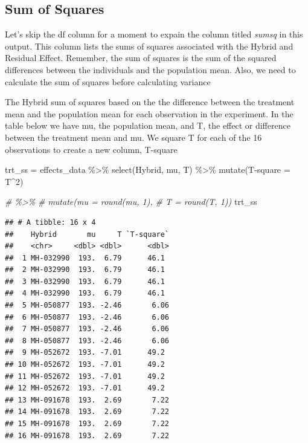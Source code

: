 \documentclass[
]{book}
\newenvironment{Shaded}{\begin{snugshade}}{\end{snugshade}}
\newcommand{\AttributeTok}[1]{\textcolor[rgb]{0.77,0.63,0.00}{#1}}
\newcommand{\CommentTok}[1]{\textcolor[rgb]{0.56,0.35,0.01}{\textit{#1}}}
\newcommand{\DecValTok}[1]{\textcolor[rgb]{0.00,0.00,0.81}{#1}}
\newcommand{\FunctionTok}[1]{\textcolor[rgb]{0.00,0.00,0.00}{#1}}
\newcommand{\NormalTok}[1]{#1}
\newcommand{\OtherTok}[1]{\textcolor[rgb]{0.56,0.35,0.01}{#1}}
\newcommand{\SpecialCharTok}[1]{\textcolor[rgb]{0.00,0.00,0.00}{#1}}
\newcommand{\StringTok}[1]{\textcolor[rgb]{0.31,0.60,0.02}{#1}}
\begin{document}
\hypertarget{sum-of-squares-1}{%
\subsection{Sum of Squares}\label{sum-of-squares-1}}

Let's skip the df column for a moment to expain the column titled \emph{sumsq} in this output. This column lists the sums of squares associated with the Hybrid and Residual Effect. Remember, the sum of squares is the sum of the squared differences between the individuals and the population mean. Also, we need to calculate the sum of squares before calculating variance

The Hybrid sum of squares based on the the difference between the treatment mean and the population mean for each observation in the experiment. In the table below we have mu, the population mean, and T, the effect or difference between the treatment mean and mu. We square T for each of the 16 observations to create a new column, T-square

\begin{Shaded}
\begin{Highlighting}[]
\NormalTok{trt\_ss }\OtherTok{=}\NormalTok{ effects\_data }\SpecialCharTok{\%\textgreater{}\%}
  \FunctionTok{select}\NormalTok{(Hybrid, mu, T) }\SpecialCharTok{\%\textgreater{}\%}
  \FunctionTok{mutate}\NormalTok{(}\StringTok{\textasciigrave{}}\AttributeTok{T{-}square}\StringTok{\textasciigrave{}} \OtherTok{=}\NormalTok{ T}\SpecialCharTok{\^{}}\DecValTok{2}\NormalTok{)}

\CommentTok{\# \%\textgreater{}\% }
\CommentTok{\#   mutate(mu = round(mu, 1),}
\CommentTok{\#          T = round(T, 1)) }
\NormalTok{trt\_ss}
\end{Highlighting}
\end{Shaded}

\begin{verbatim}
## # A tibble: 16 x 4
##    Hybrid       mu     T `T-square`
##    <chr>     <dbl> <dbl>      <dbl>
##  1 MH-032990  193.  6.79      46.1 
##  2 MH-032990  193.  6.79      46.1 
##  3 MH-032990  193.  6.79      46.1 
##  4 MH-032990  193.  6.79      46.1 
##  5 MH-050877  193. -2.46       6.06
##  6 MH-050877  193. -2.46       6.06
##  7 MH-050877  193. -2.46       6.06
##  8 MH-050877  193. -2.46       6.06
##  9 MH-052672  193. -7.01      49.2 
## 10 MH-052672  193. -7.01      49.2 
## 11 MH-052672  193. -7.01      49.2 
## 12 MH-052672  193. -7.01      49.2 
## 13 MH-091678  193.  2.69       7.22
## 14 MH-091678  193.  2.69       7.22
## 15 MH-091678  193.  2.69       7.22
## 16 MH-091678  193.  2.69       7.22
\end{verbatim}
\end{document}
